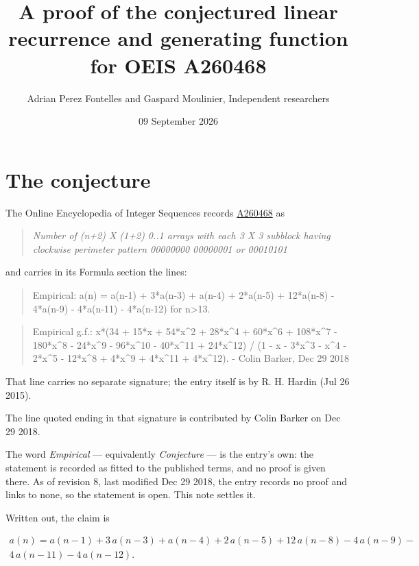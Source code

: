 \documentclass[11pt]{article}
\title{A proof of the conjectured linear recurrence and generating function for OEIS A260468}
\author{Adrian Perez Fontelles and Gaspard Moulinier, Independent researchers}
\date{09 September 2026}
\theoremstyle{definition}
\begin{document}
\maketitle
\section{The conjecture}

The Online Encyclopedia of Integer Sequences records \href{https://oeis.org/A260468}{A260468} as

\begin{quote}\itshape Number of (n+2) X (1+2) 0..1 arrays with each 3 X 3 subblock having clockwise perimeter pattern 00000000 00000001 or 00010101\end{quote}

and carries in its Formula section the lines:

\begin{quote}\ttfamily Empirical: a(n) = a(n-1) + 3*a(n-3) + a(n-4) + 2*a(n-5) + 12*a(n-8) - 4*a(n-9) - 4*a(n-11) - 4*a(n-12) for n>13.\end{quote}

\begin{quote}\ttfamily Empirical g.f.: x*(34 + 15*x + 54*x\textasciicircum{}2 + 28*x\textasciicircum{}4 + 60*x\textasciicircum{}6 + 108*x\textasciicircum{}7 - 180*x\textasciicircum{}8 - 24*x\textasciicircum{}9 - 96*x\textasciicircum{}10 - 40*x\textasciicircum{}11 + 24*x\textasciicircum{}12) / (1 - x - 3*x\textasciicircum{}3 - x\textasciicircum{}4 - 2*x\textasciicircum{}5 - 12*x\textasciicircum{}8 + 4*x\textasciicircum{}9 + 4*x\textasciicircum{}11 + 4*x\textasciicircum{}12). - Colin Barker, Dec 29 2018\end{quote}

That line carries no separate signature; the entry itself is by R. H. Hardin (Jul 26 2015).

The line quoted ending in that signature is contributed by Colin Barker on Dec 29 2018.

The word {\itshape Empirical} --- equivalently {\itshape Conjecture} --- is the entry's own: the statement is recorded as fitted to the published terms, and no proof is given there. As of revision 8, last modified Dec 29 2018, the entry records no proof and links to none, so the statement is open. This note settles it.

Written out, the claim is

\begin{multline*} a(n) = a(n-1) + 3\,a(n-3) + a(n-4) + 2\,a(n-5) + 12\,a(n-8) - 4\,a(n-9) - \\ 4\,a(n-11) - 4\,a(n-12). \end{multline*}
\end{document}

